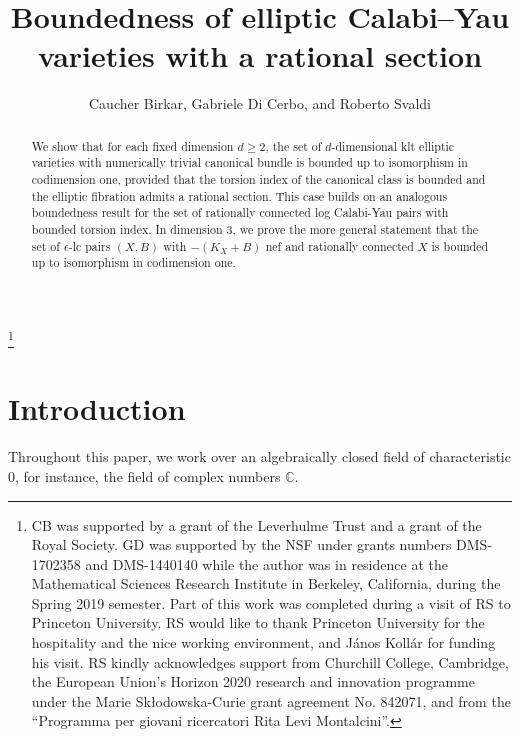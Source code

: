 \documentclass[11pt]{ip-journal}
\author{Caucher Birkar, Gabriele Di Cerbo, and Roberto Svaldi}
\title[Boundedness of elliptic Calabi--Yau varieties with section]{Boundedness of elliptic Calabi--Yau varieties with a rational section}
\theoremstyle{definition}
\begin{document}
\begin{abstract}
We show that for each fixed dimension 
$d\geq 2$, 
the set of 
$d$-dimensional 
klt elliptic varieties with numerically trivial canonical bundle is bounded up to isomorphism in codimension one, provided that the torsion index of the canonical class is bounded and the elliptic fibration admits a rational section.
This case builds on an analogous boundedness result for the set of rationally connected log Calabi-Yau pairs with bounded torsion index. 
In dimension 
$3$, 
we prove the more general statement that the set of 
$\epsilon$-lc pairs 
$(X,B)$ 
with 
$-(K_X +B)$ 
nef and rationally connected 
$X$ 
is bounded up to isomorphism in codimension one.
\end{abstract}



\thanks{
CB was supported by a grant of the Leverhulme Trust and a grant of the Royal Society.
GD was supported by the NSF under grants numbers DMS-1702358 and DMS-1440140 while the author was in residence at the Mathematical Sciences Research Institute in Berkeley, California, during the Spring 2019 semester.
Part of this work was completed during a visit of RS to Princeton University. 
RS would like to thank Princeton University for the hospitality and the nice working environment, and J\'anos Koll\'ar for funding his visit.
RS kindly acknowledges support from Churchill College, Cambridge, the European Union's Horizon 2020 research and innovation programme under the Marie Sk\l{}odowska-Curie grant agreement No. 842071, and from the ``Programma per giovani ricercatori Rita Levi Montalcini''.
}

\maketitle
\tableofcontents


\section{Introduction}\label{intro}
Throughout this paper, we work over an algebraically closed field
of characteristic 0, for instance, the field of complex numbers $\mathbb{C}$.
\end{document}

